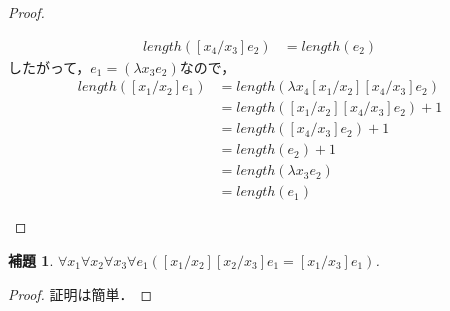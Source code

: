 \documentclass{ltjsbook}%
\newtheorem{lemma}{補題}[section]%
\begin{document}
\begin{proof}
\begin{itemize}
\begin{align}
      length([\mathit{x}_4/\mathit{x}_3]\mathit{e}_2)%
      &=length(\mathit{e}_2)%
    \end{align}%
    したがって，$\mathit{e}_1=(\lambda\mathit{x}_3\mathit{e}_2)$なので，%
    \begin{align}%
    length([\mathit{x}_1/\mathit{x}_2]\mathit{e}_1)%
    &=length(\lambda\mathit{x}_4[\mathit{x}_1/\mathit{x}_2][\mathit{x}_4/\mathit{x}_3]\mathit{e}_2)\\%
    &=length([\mathit{x}_1/\mathit{x}_2][\mathit{x}_4/\mathit{x}_3]\mathit{e}_2)+1\\%
    &=length([\mathit{x}_4/\mathit{x}_3]\mathit{e}_2)+1\\%
    &=length(\mathit{e}_2)+1\\%
    &=length(\lambda\mathit{x}_3\mathit{e}_2)\\%
    &=length(\mathit{e}_1)%
    \end{align}%
  \end{itemize}%
\end{proof}%
\begin{lemma}%
  \label{lemma:subst_trans}%
  $\forall\mathit{x}_1\forall\mathit{x}_2\forall\mathit{x}_3\forall\mathit{e}_1%
  ([\mathit{x}_1/\mathit{x}_2][\mathit{x}_2/\mathit{x}_3]\mathit{e}_1%
  =[\mathit{x}_1/\mathit{x}_3]\mathit{e}_1)$.%
\end{lemma}%
\begin{proof}%
  証明は簡単．%
\end{proof}%
\end{document}

